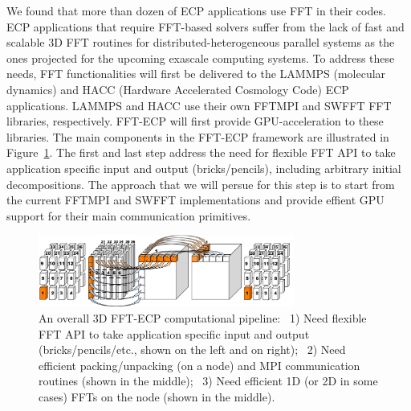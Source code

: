 We found that more than dozen of ECP applications use FFT in their codes.
ECP applications that require FFT-based solvers suffer from the lack of 
fast and scalable 3D FFT routines for distributed-heterogeneous parallel 
systems as the ones projected for the upcoming exascale computing systems. 
To address these needs, FFT functionalities will first be delivered 
to the LAMMPS (molecular dynamics) and HACC (Hardware Accelerated
Cosmology Code) ECP applications. 
LAMMPS and HACC use their own FFTMPI and SWFFT FFT libraries, respectively.
FFT-ECP will first provide GPU-acceleration to these libraries.
The main components in the FFT-ECP framework are illustrated in 
Figure~\ref{fig:fft-ecp-pipeline}. The first and last step address the need 
for flexible FFT API to take application specific input and output (bricks/pencils), 
including arbitrary initial decompositions. The approach that we will persue for 
this step is to start from the current FFTMPI and SWFFT implementations and 
provide effient GPU support for their main communication primitives. 

\begin{figure}[htb]
    \centering
    \includegraphics[width=0.75\textwidth]{projects/2.3.3-MathLibs/2.3.3.09-SLATE/ffttransormations}
    \caption{\label{fig:fft-ecp-pipeline}
    An overall 3D FFT-ECP computational pipeline:~
      1) Need flexible FFT API to take application specific input and output
         (bricks/pencils/etc., shown on the left and on right);~
      2) Need efficient packing/unpacking (on a node) and MPI communication
         routines (shown in the middle);~
      3) Need efficient 1D (or 2D in some cases) FFTs on the node (shown in the middle).}
\end{figure}

